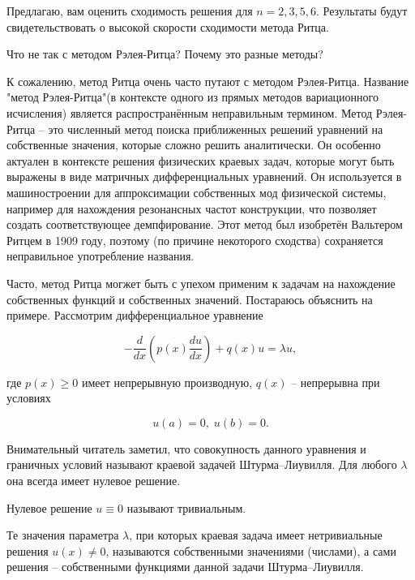 \noindent Предлагаю, вам оценить сходимость решения для $n = 2, 3, 5, 6$. Результаты будут свидетельствовать о высокой скорости сходимости метода Ритца.

\newpage
\begin{question}
	Что не так с методом Рэлея-Ритца? Почему это разные методы?
\end{question}

\begin{warn}[Важно!]
	К сожалению, метод Ритца очень часто путают с методом Рэлея-Ритца. Название "метод Рэлея-Ритца"\;(в контексте одного из прямых методов вариационного исчисления) является распространённым неправильным термином. Метод Рэлея-Ритца -- это численный метод поиска приближенных решений уравнений на собственные значения, которые сложно решить аналитически. Он особенно актуален в контексте решения физических краевых задач, которые могут быть выражены в виде матричных дифференциальных уравнений. Он используется в машиностроении для аппроксимации собственных мод физической системы, например для нахождения резонансных частот конструкции, что позволяет создать соответствующее демпфирование. Этот метод был изобретён Вальтером Ритцем в 1909 году, поэтому (по причине некоторого сходства) сохраняется неправильное употребление названия.
\end{warn}

Часто, метод Ритца могжет быть с упехом применим к задачам на нахождение собственных функций и собственных значений. Постараюсь объяснить на примере. Рассмотрим дифференциальное уравнение

\begin{displaymath}
	- \frac{d}{dx} \left( p(x) \frac{du}{dx} \right) + q(x)u = \lambda u,
\end{displaymath}

\noindent где $p(x) \geq 0$ имеет непрерывную производную, $q(x)$ -- непрерывна при условиях

\begin{displaymath}
	u(a) = 0, \; u(b) = 0.
\end{displaymath}

Внимательный читатель заметил, что совокупность данного уравнения и граничных условий называют краевой задачей Штурма--Лиувилля. Для любого $\lambda$ она всегда имеет нулевое решение.

\begin{info}
	Нулевое решение $u \equiv 0$ называют тривиальным.
\end{info}

Те значения параметра $\lambda$, при которых краевая задача имеет нетривиальные решения $u(x) \neq 0$, называются собственными значениями (числами), а сами решения -- собственными функциями данной задачи Штурма--Лиувилля.

